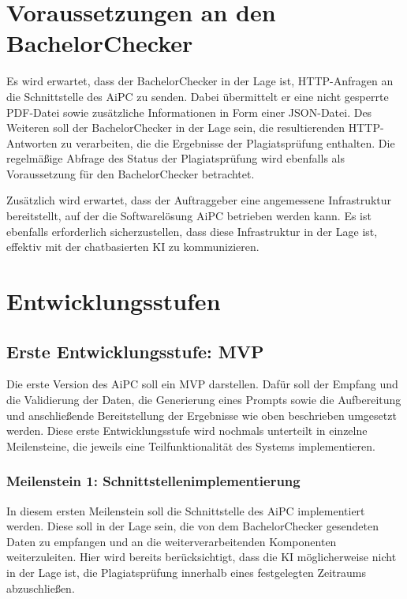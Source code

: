 \section{Voraussetzungen an den BachelorChecker}\label{sec:voraussetzungen-an-den-bachelorchecker}

Es wird erwartet, dass der BachelorChecker in der Lage ist, \ac{HTTP}-Anfragen an die Schnittstelle des \ac{AiPC} zu senden.
Dabei übermittelt er eine nicht gesperrte \ac{PDF}-Datei sowie zusätzliche Informationen in Form einer \ac{JSON}-Datei.
Des Weiteren soll der BachelorChecker in der Lage sein, die resultierenden \ac{HTTP}-Antworten zu verarbeiten, die die Ergebnisse der Plagiatsprüfung enthalten.
Die regelmäßige Abfrage des Status der Plagiatsprüfung wird ebenfalls als Voraussetzung für den BachelorChecker betrachtet.

Zusätzlich wird erwartet, dass der Auftraggeber eine angemessene Infrastruktur bereitstellt, auf der die Softwarelösung \ac{AiPC} betrieben werden kann.
Es ist ebenfalls erforderlich sicherzustellen, dass diese Infrastruktur in der Lage ist, effektiv mit der chatbasierten \ac{KI} zu kommunizieren.

\section{Entwicklungsstufen}\label{sec:entwicklungsstufen}

\subsection{Erste Entwicklungsstufe: MVP}

Die erste Version des \ac{AiPC} soll ein \ac{MVP} darstellen.
Dafür soll der Empfang und die Validierung der Daten, die Generierung eines Prompts sowie die Aufbereitung und anschließende Bereitstellung der Ergebnisse wie oben beschrieben umgesetzt werden.
Diese erste Entwicklungsstufe wird nochmals unterteilt in einzelne Meilensteine, die jeweils eine Teilfunktionalität des Systems implementieren.

\subsubsection{Meilenstein 1: Schnittstellenimplementierung}
In diesem ersten Meilenstein soll die Schnittstelle des \ac{AiPC} implementiert werden.
Diese soll in der Lage sein, die von dem BachelorChecker gesendeten Daten zu empfangen und an die weiterverarbeitenden Komponenten weiterzuleiten.
Hier wird bereits berücksichtigt, dass die \ac{KI} möglicherweise nicht in der Lage ist, die Plagiatsprüfung innerhalb eines festgelegten Zeitraums abzuschließen.

